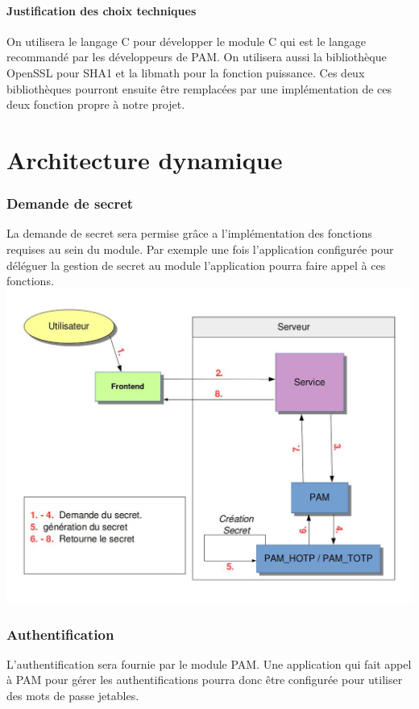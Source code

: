 \documentclass{"../../res/univ-projet"}
\begin{document}
\subsection{Justification des choix techniques}
On utilisera le langage C pour développer le module C qui est le langage recommandé par
les développeurs de PAM. On utilisera aussi la bibliothèque OpenSSL pour SHA1 et la libmath
pour la fonction puissance. Ces deux bibliothèques pourront ensuite être remplacées par une implémentation
de ces deux fonction propre à notre projet.

\part*{Architecture dynamique}
\section{Demande de secret}
La demande de secret sera permise grâce a l'implémentation des fonctions requises au sein du
module. Par exemple une fois l'application configurée pour déléguer la gestion de secret au
module l'application pourra faire appel à ces fonctions.
\newline
\includegraphics[width=\textwidth]{../graphics/association.jpg}

\section{Authentification}
L'authentification sera fournie par le module PAM. Une application qui fait appel à PAM pour gérer
les authentifications pourra donc être configurée pour utiliser des mots de passe jetables.
\end{document}
